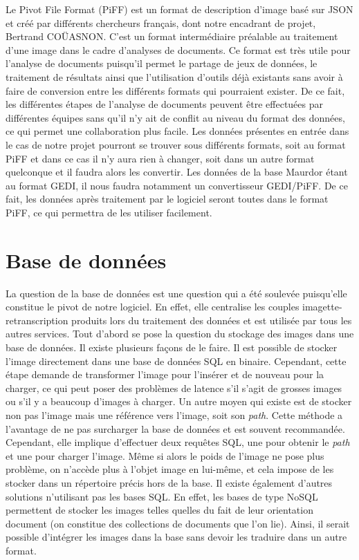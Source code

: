 Le Pivot File Format (PiFF) est un format de description d'image basé sur JSON et créé par différents
chercheurs français, dont notre encadrant de projet, Bertrand COÜASNON. C’est un format intermédiaire préalable
au traitement d’une image dans le cadre d’analyses de documents. Ce format est très utile pour l'analyse
de documents puisqu'il permet le partage de jeux de données, le traitement de résultats ainsi que
l'utilisation d'outils déjà existants sans avoir à faire de conversion entre les différents formats
qui pourraient exister. De ce fait, les différentes étapes de l'analyse de documents peuvent être effectuées
par différentes équipes sans qu'il n'y ait de conflit au niveau du format des données, ce qui permet une
collaboration plus facile. Les données présentes en entrée dans le cas de notre projet pourront se trouver
sous différents formats, soit au format PiFF et dans ce cas il n’y aura rien à changer, soit dans un autre
format quelconque et il faudra alors les convertir. Les données de la base Maurdor étant au format GEDI,
il nous faudra notamment un convertisseur GEDI/PiFF. De ce fait, les données après traitement par le logiciel
seront toutes dans le format PiFF, ce qui permettra de les utiliser facilement.

\section{Base de données}

La question de la base de données est une question qui a été soulevée puisqu’elle constitue le pivot de notre
logiciel. En effet, elle centralise les couples imagette-retranscription produits lors du traitement des données
et est utilisée par tous les autres services. Tout d’abord se pose la question du stockage des images dans
une base de données. Il existe plusieurs façons de le faire. Il est possible de stocker l’image directement dans
une base de données SQL en binaire. Cependant, cette étape demande de transformer l’image pour l'insérer et de nouveau
pour la charger, ce qui peut poser des problèmes de latence s’il s’agit de grosses images ou s'il y a beaucoup
d’images à charger. Un autre moyen qui existe est de stocker non pas l’image mais une référence vers l’image,
soit son \textit{path}. Cette méthode a l’avantage de ne pas surcharger la base de données et est souvent recommandée.
Cependant, elle implique d’effectuer deux requêtes SQL, une pour obtenir le \textit{path} et une pour charger l’image.
Même si alors le poids de l’image ne pose plus problème, on n’accède plus à l’objet image en lui-même, et cela impose de les
stocker dans un répertoire précis hors de la base. Il existe également d’autres solutions n'utilisant pas les bases SQL.
En effet, les bases de type NoSQL permettent de stocker les images telles quelles du fait de leur orientation document
(on constitue des collections de documents que l'on lie). Ainsi, il serait possible d’intégrer les images dans la base
sans devoir les traduire dans un autre format.

